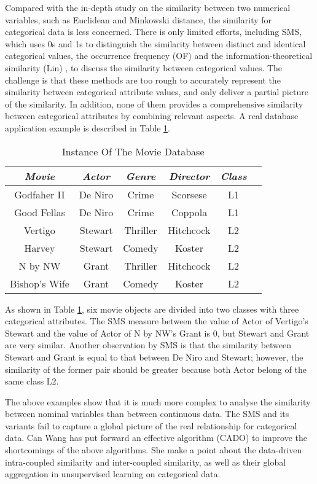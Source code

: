 \documentclass[review]{elsarticle}
\begin{document}
Compared with the in-depth study on the similarity between two numerical variables, such as Euclidean and Minkowski distance, the similarity for categorical data is less concerned. There is only limited efforts, including SMS, which uses 0s and 1s to distinguish the similarity between distinct and identical categorical values, the occurrence frequency (OF) \cite{BoriahS2008Comparative} and the information-theoretical similarity (Lin) \cite{BoriahS2008Comparative}, to discuss the similarity between categorical values. The challenge is that these methods are too rough to accurately represent the similarity between categorical attribute values, and only deliver a partial picture of the similarity. In addition, none of them provides a comprehensive similarity between categorical attributes by combining relevant aspects. A real database application example is described in Table \ref{tab:movie data}.
\begin{table}[!h]\tabcolsep=0.065in
\centering
\caption{Instance Of The Movie Database}
\small
\label{tab:movie data}
\begin{tabular}{|c|c|c|c|c|c|}
\hline
\emph{Movie}&\emph{Actor}&\emph{Genre}&\emph{Director}&\emph{Class} \\
\hline
Godfaher II & De Niro & Crime & Scorsese & L1 \\
\hline
Good Fellas & De Niro & Crime & Coppola & L1 \\
\hline
Vertigo & Stewart & Thriller & Hitchcock & L2 \\
\hline
Harvey & Stewart & Comedy & Koster & L2 \\
\hline
N by NW & Grant & Thriller & Hitchcock & L2 \\
\hline
Bishop's Wife & Grant & Comedy & Koster & L2 \\
\hline
\end{tabular}
\end{table}

As shown in Table \ref{tab:movie data}, six movie objects are divided into two classes with three categorical attributes. The SMS measure between the value of Actor of Vertigo's Stewart and the value of Actor of N by NW's Grant is 0, but Stewart and Grant are very similar. Another observation by SMS is that the similarity between Stewart and Grant is equal to that between De Niro and Stewart; however, the similarity of the former pair should be greater because both Actor belong of the same class L2.

The above examples show that it is much more complex to analyse the similarity between nominal variables than between continuous data. The SMS and its variants fail to capture a global picture of the real relationship for categorical data. Can Wang has put forward an effective algorithm \cite{WangC2015CADO} (CADO) to improve the shortcomings of the above algorithms. She make a point about the data-driven intra-coupled similarity and inter-coupled similarity, as well as their global aggregation in unsupervised learning on categorical data.
\end{document}
